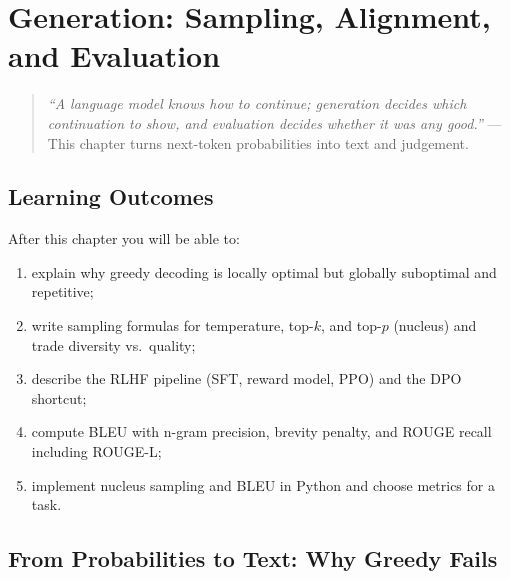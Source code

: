 \chapter{Generation: Sampling, Alignment, and Evaluation}
\label{ch:generation}

\begin{quote}
\emph{``A language model knows how to continue; generation decides \emph{which} continuation to show, and evaluation decides whether it was any good.''} --- This chapter turns next-token probabilities into text and judgement.
\end{quote}

\noindent{}
\vspace{0.4em}

\section*{Learning Outcomes}
After this chapter you will be able to:
\begin{enumerate}[label=(L\arabic*)]
    \item explain why greedy decoding is locally optimal but globally suboptimal and repetitive;
    \item write sampling formulas for temperature, top-$k$, and top-$p$ (nucleus) and trade diversity vs.\ quality;
    \item describe the RLHF pipeline (SFT, reward model, PPO) and the DPO shortcut;
    \item compute BLEU with n-gram precision, brevity penalty, and ROUGE recall including ROUGE-L;
    \item implement nucleus sampling and BLEU in Python and choose metrics for a task.
\end{enumerate}

\section{From Probabilities to Text: Why Greedy Fails}
\label{sec:greedy-intuition}

